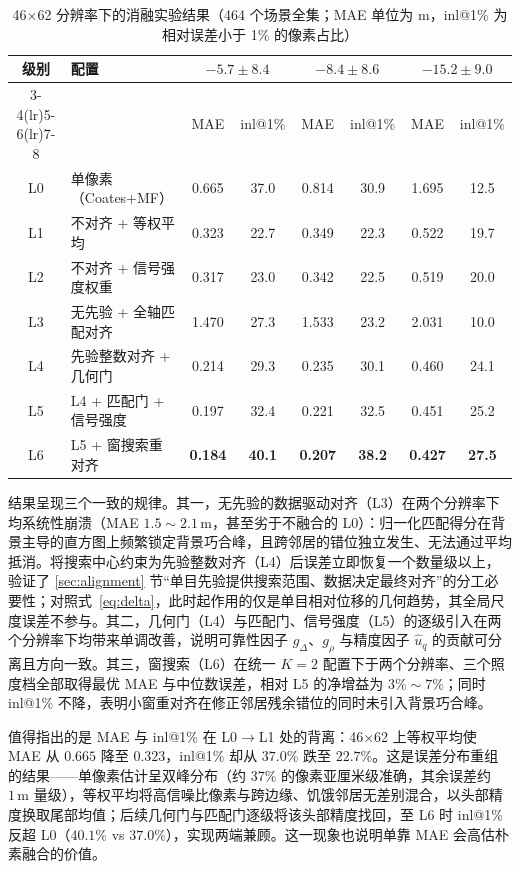 \begin{table}[!t]
\centering
\caption{46×62 分辨率下的消融实验结果（464 个场景全集；MAE 单位为 m，inl@1\% 为相对误差小于 1\% 的像素占比）}
\label{tab:ablation46}\scriptsize\setlength{\tabcolsep}{2.5pt}
\begin{tabular}{clcccccc}
\toprule
\multirow{2}{*}{级别} & \multirow{2}{*}{配置} & \multicolumn{2}{c}{$-5.7\pm8.4$} & \multicolumn{2}{c}{$-8.4\pm8.6$} & \multicolumn{2}{c}{$-15.2\pm9.0$} \\
\cmidrule(lr){3-4}\cmidrule(lr){5-6}\cmidrule(lr){7-8}
 & & MAE & inl@1\% & MAE & inl@1\% & MAE & inl@1\% \\
\midrule
L0 & 单像素（Coates+MF） & 0.665 & 37.0 & 0.814 & 30.9 & 1.695 & 12.5 \\
L1 & 不对齐 + 等权平均 & 0.323 & 22.7 & 0.349 & 22.3 & 0.522 & 19.7 \\
L2 & 不对齐 + 信号强度权重 & 0.317 & 23.0 & 0.342 & 22.5 & 0.519 & 20.0 \\
L3 & 无先验 + 全轴匹配对齐 & 1.470 & 27.3 & 1.533 & 23.2 & 2.031 & 10.0 \\
L4 & 先验整数对齐 + 几何门 & 0.214 & 29.3 & 0.235 & 30.1 & 0.460 & 24.1 \\
L5 & L4 + 匹配门 + 信号强度 & 0.197 & 32.4 & 0.221 & 32.5 & 0.451 & 25.2 \\
L6 & L5 + 窗搜索重对齐 & \textbf{0.184} & \textbf{40.1} & \textbf{0.207} & \textbf{38.2} & \textbf{0.427} & \textbf{27.5} \\
\bottomrule
\end{tabular}
\end{table}

结果呈现三个一致的规律。其一，无先验的数据驱动对齐（L3）在两个分辨率下均系统性崩溃（MAE $1.5\sim2.1\,\mathrm{m}$，甚至劣于不融合的 L0）：归一化匹配得分在背景主导的直方图上频繁锁定背景巧合峰，且跨邻居的错位独立发生、无法通过平均抵消。将搜索中心约束为先验整数对齐（L4）后误差立即恢复一个数量级以上，验证了 \ref{sec:alignment} 节“单目先验提供搜索范围、数据决定最终对齐”的分工必要性；对照式~\eqref{eq:delta}，此时起作用的仅是单目相对位移的几何趋势，其全局尺度误差不参与。其二，几何门（L4）与匹配门、信号强度（L5）的逐级引入在两个分辨率下均带来单调改善，说明可靠性因子 $g_\Delta$、$g_\rho$ 与精度因子 $\hat u_q$ 的贡献可分离且方向一致。其三，窗搜索（L6）在统一 $K=2$ 配置下于两个分辨率、三个照度档全部取得最优 MAE 与中位数误差，相对 L5 的净增益为 $3\%\sim7\%$；同时 inl@1\% 不降，表明小窗重对齐在修正邻居残余错位的同时未引入背景巧合峰。

值得指出的是 MAE 与 inl@1\% 在 L0$\to$L1 处的背离：46×62 上等权平均使 MAE 从 $0.665$ 降至 $0.323$，inl@1\% 却从 $37.0\%$ 跌至 $22.7\%$。这是误差分布重组的结果——单像素估计呈双峰分布（约 37\% 的像素亚厘米级准确，其余误差约 $1\,\mathrm{m}$ 量级），等权平均将高信噪比像素与跨边缘、饥饿邻居无差别混合，以头部精度换取尾部均值；后续几何门与匹配门逐级将该头部精度找回，至 L6 时 inl@1\% 反超 L0（$40.1\%$ vs $37.0\%$），实现两端兼顾。这一现象也说明单靠 MAE 会高估朴素融合的价值。


